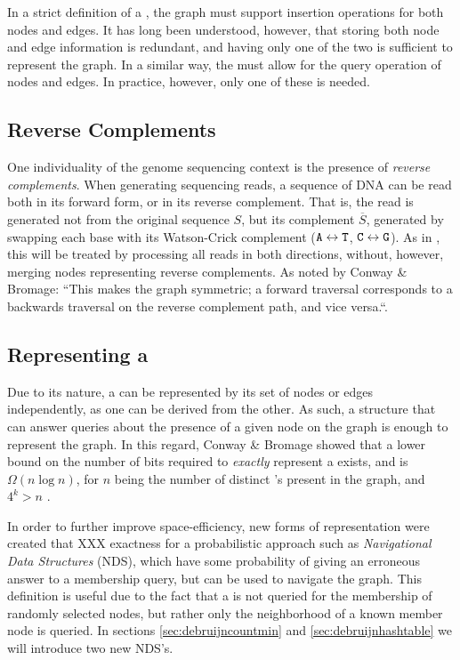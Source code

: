 In a strict definition of a \dBG, the graph must support insertion operations for both nodes and edges. It has long been understood,
however, that storing both node and edge information is redundant, and having only one of the two is sufficient to represent the graph.
In a similar way, the \dBG must allow for the query operation of nodes and edges. In practice, however, only one of these is needed.

\subsection{Reverse Complements}

One individuality of the genome sequencing context is the presence of \emph{reverse complements}. When generating sequencing reads,
a sequence of DNA can be read both in its forward form, or in its reverse complement. That is, the read is generated not from the
original sequence $S$, but its complement $\overline{S}$, generated by swapping each base with its Watson-Crick complement
($\mathtt{A} \leftrightarrow \mathtt{T}$, $\mathtt{C} \leftrightarrow \mathtt{G}$). As in \cite{Conway2011}, this will be treated by processing all reads in both
directions, without, however, merging nodes representing reverse complements. As noted by Conway \& Bromage: ``This makes the graph
symmetric; a forward traversal corresponds to a backwards traversal on the reverse complement path, and vice versa.``\cite{Conway2011}.

\subsection{Representing a \dBG}

Due to its nature, a \dBG can be represented by its set of nodes or edges independently, as one can be derived from the other.
 As such, a structure that can answer queries about the presence of a given node on the graph is enough to
represent the graph. In this regard, Conway \& Bromage showed that a lower bound on the number of bits required to \emph{exactly}
represent a \dBG exists, and is $\Omega(n \log n)$, for $n$ being the number of distinct \kmer's present in the graph, and $4^k > n$
\cite{Conway2011}.

In order to further improve space-efficiency, new forms of representation were created that XXX exactness for a probabilistic approach
such as \emph{Navigational Data Structures} (NDS), which have some probability of giving an erroneous answer to a membership query, 
but can be used to navigate the graph. This definition is useful due to the fact that a \dBG is not queried for the membership of randomly
selected nodes, but rather only the neighborhood of a known member node is queried\cite{Chikhi2014}. In sections \ref{sec:debruijncountmin}
and \ref{sec:debruijnhashtable} we will introduce two new NDS's.

